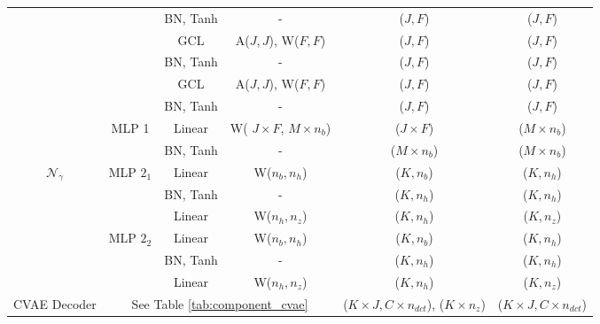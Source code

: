 \documentclass[sigconf,screen,nonacm]{acmart}
\begin{document}
\begin{table}[!t]
{\begin{tabular}{c|ccc|c|c}
				& \multicolumn{1}{c|}{}                              & \multicolumn{1}{c|}{BN, Tanh} &  -                      & ($J, F$)   & ($J, F$)                 \\ \cline{3-6} 
				& \multicolumn{1}{c|}{}                              & \multicolumn{1}{c|}{GCL}     & A($J , J$), W($F, F$) & ($J, F$)   & ($J, F$)                 \\ \cline{3-6}
				& \multicolumn{1}{c|}{}                              & \multicolumn{1}{c|}{BN, Tanh}  & -                       & ($J, F$)   & ($J, F$)                 \\ \cline{3-6} 
				& \multicolumn{1}{c|}{}                              & \multicolumn{1}{c|}{GCL}      & A($J , J$), W($F, F$) & ($J, F$)   & ($J, F$)                 \\ \cline{3-6} 
				& \multicolumn{1}{c|}{}                              & \multicolumn{1}{c|}{BN, Tanh}  & -                       & ($J, F$)   & ($J, F$)                 \\ \cline{2-6} 
				
				& \multicolumn{1}{c|}{\multirow{2}{*}{MLP 1}}  & \multicolumn{1}{c|}{Linear}  & W( $J \times F$, $M \times n_b$)       & ($J \times F$)    & ($M \times n_b$)                 \\ \cline{3-6} 
				& \multicolumn{1}{c|}{}                              & \multicolumn{1}{c|}{BN, Tanh} & -               & ($M \times n_b$)   & ($M \times n_b$)                 \\ \hline
				\multirow{6}{*}{$\mathcal{N}_{\gamma}$} & \multicolumn{1}{c|}{\multirow{3}{*}{MLP $2_1$}} & \multicolumn{1}{c|}{Linear}   & W($n_b, n_h$)             & ($K, n_b$)  & ($K, n_h$)                 \\ \cline{3-6} 
				& \multicolumn{1}{c|}{}                              & \multicolumn{1}{c|}{BN, Tanh} &  -                      & ($K, n_h$)   & ($K, n_h$)                 \\ \cline{3-6} 
				& \multicolumn{1}{c|}{}                              & \multicolumn{1}{c|}{Linear}   & W($n_h, n_z$)              & ($K, n_h$)   & ($K, n_z$)                 \\ \cline{2-6} 
				& \multicolumn{1}{c|}{\multirow{3}{*}{MLP $2_2$}} & \multicolumn{1}{c|}{Linear}   & W($n_b, n_h$)             & ($K, n_b$)  & ($K, n_h$)                 \\ \cline{3-6} 
				& \multicolumn{1}{c|}{}                              & \multicolumn{1}{c|}{BN, Tanh} &  -                      & ($K, n_h$)   & ($K, n_h$)                 \\ \cline{3-6} 
				& \multicolumn{1}{c|}{}                              & \multicolumn{1}{c|}{Linear}   & W($n_h, n_z$)              & ($K, n_h$)   & ($K, n_z$)                 \\ \hline
				CVAE Decoder                 & \multicolumn{3}{c|}{See Table \ref{tab:component_cvae} }                                  & ($K \times J, C \times n_{dct}$), ($K \times n_z$) & ($K \times J, C \times n_{dct}$) \\ \bottomrule
			\end{tabular}
		}
	\end{table}
	
\end{document}
